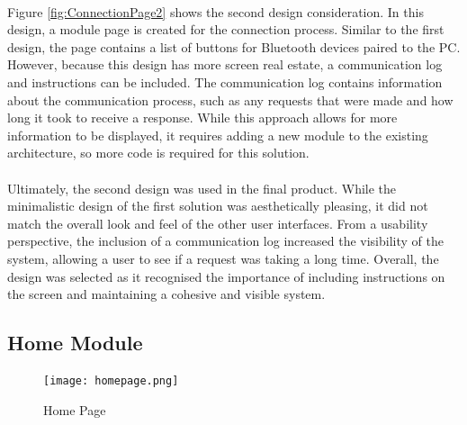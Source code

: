 {		\paragraph{}{
		Figure \ref{fig:ConnectionPage2} shows the second design consideration. In this design, a module page is created for the connection process. Similar to the first design, the page contains a list of buttons for Bluetooth devices paired to the PC. However, because this design has more screen real estate, a communication log and instructions can be included. The communication log contains information about the communication process, such as any requests that were made and how long it took to receive a response. While this approach allows for more information to be displayed, it requires adding a new module to the existing architecture, so more code is required for this solution.
		}
		
		\paragraph{}{
		Ultimately, the second design was used in the final product. While the minimalistic design of the first solution was aesthetically pleasing, it did not match the overall look and feel of the other user interfaces. From a usability perspective, the inclusion of a communication log increased the visibility of the system, allowing a user to see if a request was taking a long time. Overall, the design was selected as it recognised the importance of including instructions on the screen and maintaining a cohesive and visible system.
		}
	}
	\label{ssec:DesignConnectionModule}
	
	\subsection{Home Module}
		\paragraph{}{
		
		}
		\begin{figure}[h]
			\begin{center}
				\texttt{[image: homepage.png]}
				\caption{Home Page}
				\label{fig:HomePage}
			\end{center}
		\end{figure}
